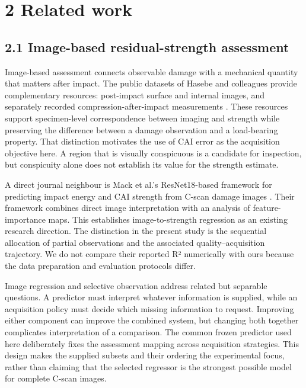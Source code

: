 \section{2 Related work}\label{related-work}

\subsection{2.1 Image-based residual-strength assessment}\label{image-based-residual-strength-assessment}

Image-based assessment connects observable damage with a mechanical quantity that matters after impact. The public datasets of Hasebe and colleagues provide complementary resources: post-impact surface and internal images, and separately recorded compression-after-impact measurements \citep{hasebe2022data, hasebe2025data}. These resources support specimen-level correspondence between imaging and strength while preserving the difference between a damage observation and a load-bearing property. That distinction motivates the use of CAI error as the acquisition objective here. A region that is visually conspicuous is a candidate for inspection, but conspicuity alone does not establish its value for the strength estimate.

A direct journal neighbour is Mack et al.'s ResNet18-based framework for predicting impact energy and CAI strength from C-scan damage images \citep{mack2026}. Their framework combines direct image interpretation with an analysis of feature-importance maps. This establishes image-to-strength regression as an existing research direction. The distinction in the present study is the sequential allocation of partial observations and the associated quality--acquisition trajectory. We do not compare their reported R² numerically with ours because the data preparation and evaluation protocols differ.

Image regression and selective observation address related but separable questions. A predictor must interpret whatever information is supplied, while an acquisition policy must decide which missing information to request. Improving either component can improve the combined system, but changing both together complicates interpretation of a comparison. The common frozen predictor used here deliberately fixes the assessment mapping across acquisition strategies. This design makes the supplied subsets and their ordering the experimental focus, rather than claiming that the selected regressor is the strongest possible model for complete C-scan images.


